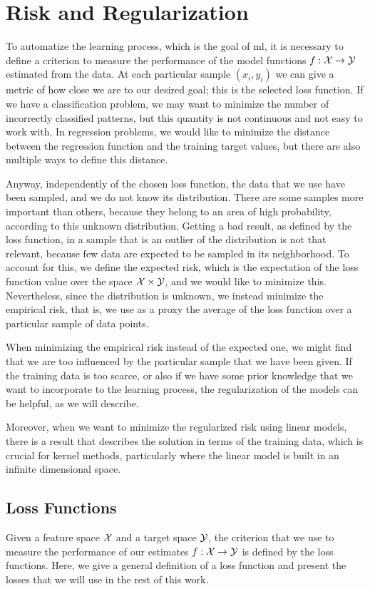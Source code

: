 \section{Risk and Regularization}\label{sec:risk_reg}
To automatize the learning process, which is the goal of \acrshort{ml}, it is necessary to define a criterion to measure the performance of the model functions $f: \mathcal{X} \to \mathcal{Y}$ estimated from the data.
At each particular sample $(x_i, y_i)$ we can give a metric of how close we are to our desired goal; this is the selected loss function. If we have a classification problem, we may want to minimize the number of incorrectly classified patterns, but this quantity is not continuous and not easy to work with. In regression problems, we would like to minimize the distance between the regression function and the training target values, but there are also multiple ways to define this distance. 
%

Anyway, independently of the chosen loss function, the data that we use have been sampled, and we do not know its distribution. There are some samples more important than others, because they belong to an area of high probability, according to this unknown distribution. Getting a bad result, as defined by the loss function, in a sample that is an outlier of the distribution is not that relevant, because few data are expected to be sampled in its neighborhood. 
To account for this, we define the expected risk, which is the expectation of the loss function value over the space $\mathcal{X} \times \mathcal{Y}$, and we would like to minimize this. Nevertheless, since the distribution is unknown, we instead minimize the empirical risk, that is, we use as a proxy the average of the loss function over a particular sample of data points.

%
When minimizing the empirical risk instead of the expected one, we might find that we are too influenced by the particular sample that we have been given.  If the training data is too scarce, or also if we have some prior knowledge that we want to incorporate to the learning process, the regularization of the models can be helpful, as we will describe.
%

Moreover, when we want to minimize the regularized risk using linear models, there is a result that describes the solution in terms of the training data, which is crucial for kernel methods, particularly where the linear model is built in an infinite dimensional space.

\subsection{Loss Functions}
Given a feature space $\mathcal{X}$ and a target space $\mathcal{Y}$, the criterion that we use to measure the performance of our estimates $f: \mathcal{X} \to \mathcal{Y}$ is defined by the loss functions.
Here, we give a general definition of a loss function and present the losses that we will use in the rest of this work.

